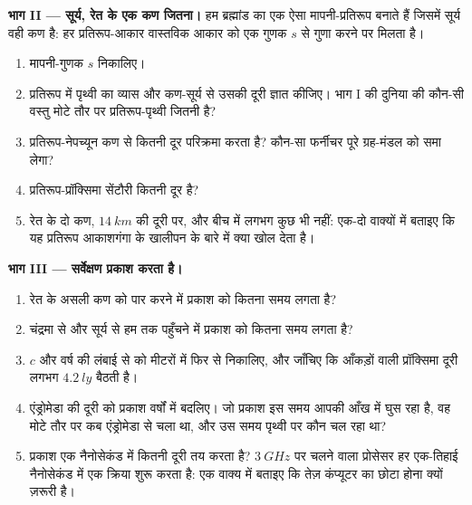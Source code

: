 \begin{problem}
\medskip
\noindent\textbf{भाग II --- सूर्य, रेत के एक कण जितना।}
हम ब्रह्मांड का एक ऐसा मापनी-प्रतिरूप बनाते हैं जिसमें सूर्य वही कण है:
हर प्रतिरूप-आकार वास्तविक आकार को एक गुणक $s$ से गुणा करने पर
मिलता है।
\begin{enumerate}[resume]
  \item मापनी-गुणक $s$ निकालिए।
  \item प्रतिरूप में पृथ्वी का व्यास और कण-सूर्य से उसकी दूरी ज्ञात
        कीजिए। भाग I की दुनिया की कौन-सी वस्तु मोटे तौर पर
        प्रतिरूप-पृथ्वी जितनी है?
  \item प्रतिरूप-नेपच्यून कण से कितनी दूर परिक्रमा करता है? कौन-सा
        फर्नीचर पूरे ग्रह-मंडल को समा लेगा?
  \item प्रतिरूप-प्रॉक्सिमा सेंटौरी कितनी दूर है?
  \item रेत के दो कण, $\qty{14}{km}$ की दूरी पर, और बीच में लगभग कुछ भी नहीं:
        एक-दो वाक्यों में बताइए कि यह प्रतिरूप आकाशगंगा के खालीपन के
        बारे में क्या खोल देता है।
\end{enumerate}

\medskip
\noindent\textbf{भाग III --- सर्वेक्षण प्रकाश करता है।}
\begin{enumerate}[resume]
  \item रेत के असली कण को पार करने में प्रकाश को कितना समय लगता है?
  \item चंद्रमा से और सूर्य से हम तक पहुँचने में प्रकाश को कितना समय
        लगता है?
  \item $c$ और वर्ष की लंबाई से  को
        मीटरों में फिर से निकालिए, और जाँचिए कि आँकड़ों वाली
        प्रॉक्सिमा दूरी लगभग $\qty{4.2}{ly}$ बैठती है।
  \item एंड्रोमेडा की दूरी को प्रकाश वर्षों में बदलिए। जो
        प्रकाश इस समय आपकी आँख में घुस रहा है, वह मोटे तौर पर कब
        एंड्रोमेडा से चला था, और उस समय पृथ्वी पर कौन चल रहा था?
  \item प्रकाश एक नैनोसेकंड में कितनी दूरी तय करता है? $\qty{3}{GHz}$ पर चलने
        वाला प्रोसेसर हर एक-तिहाई नैनोसेकंड में एक क्रिया शुरू करता है:
        एक वाक्य में बताइए कि तेज़ कंप्यूटर का छोटा होना क्यों ज़रूरी
        है।
\end{enumerate}


\end{problem}
